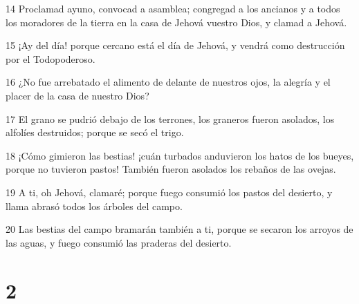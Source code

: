 \par 14 Proclamad ayuno, convocad a asamblea; congregad a los ancianos y a todos los moradores de la tierra en la casa de Jehová vuestro Dios, y clamad a Jehová.
\par 15 ¡Ay del día! porque cercano está el día de Jehová, y vendrá como destrucción por el Todopoderoso. 
\par 16 ¿No fue arrebatado el alimento de delante de nuestros ojos, la alegría y el placer de la casa de nuestro Dios?
\par 17 El grano se pudrió debajo de los terrones, los graneros fueron asolados, los alfolíes destruidos; porque se secó el trigo.
\par 18 ¡Cómo gimieron las bestias! ¡cuán turbados anduvieron los hatos de los bueyes, porque no tuvieron pastos! También fueron asolados los rebaños de las ovejas.
\par 19 A ti, oh Jehová, clamaré; porque fuego consumió los pastos del desierto, y llama abrasó todos los árboles del campo.
\par 20 Las bestias del campo bramarán también a ti, porque se secaron los arroyos de las aguas, y fuego consumió las praderas del desierto.

\chapter{2}

